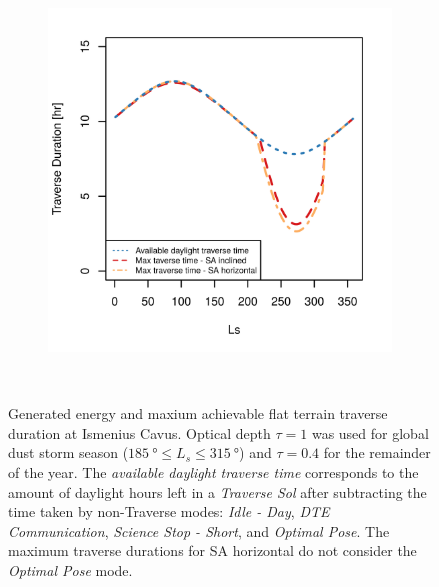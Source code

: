 \begin{figure}[h]
\begin{subfigure}[t]{\subfigureWidth}
        \includegraphics[height=\graphicsHeight]{sections/design/solar-array/plots/ismeniuscavus-75w-max-traverse-durations.png}
		\label{fig:plot:sub:ismenius-cavus-max-traverse-durations}
	\end{subfigure}\\[0.8ex]
    \caption[Generated energy and maxium achievable flat terrain traverse durations at Ismenius Cavus]
            {Generated energy and maxium achievable flat terrain traverse duration at Ismenius Cavus. Optical depth  $\tau = 1$ was used for global dust storm season ($\SI{185}{\degree} \leq L_{s} \leq \SI{315}{\degree}$) and $\tau = 0.4$ for the remainder of the year. The \textit{available daylight traverse time} corresponds to the amount of daylight hours left in a \textit{Traverse Sol} after subtracting the time taken by non-Traverse modes: \textit{Idle - Day}, \textit{\ac{DTE} Communication}, \textit{Science Stop - Short}, and \textit{Optimal Pose}. The maximum traverse durations for \ac{SA} horizontal do not consider the \textit{Optimal Pose} mode.}
    \label{fig:plot:ismenius-cavus-generated-energy-and-max-traverse-durations}
\vspace{-2ex}
\end{figure}

